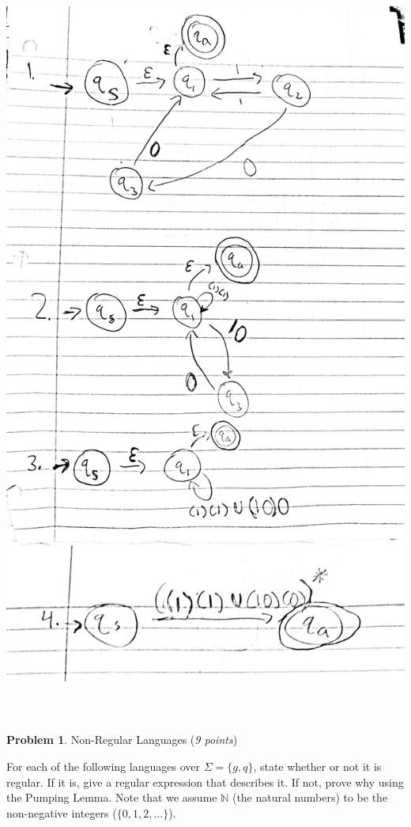 \documentclass[11pt]{article}
\theoremstyle{definition}
\theoremstyle{theorem}
\newtheorem{prob}{Problem}
\begin{document}
\includegraphics[width=15cm, height=25cm]{./p3_images/d2a.jpg}


\newpage

\begin{prob} Non-Regular Languages (\emph{9 points})\end{prob}

For each of the following languages over $\Sigma = \{g, q\}$, state whether or not it is regular. If it is, give a regular expression that describes it. If not, prove why using the Pumping Lemma. Note that we assume $\mathbb{N}$ (the natural numbers) to be the non-negative integers ($\{0, 1, 2, \dots\}$).
\end{document}
